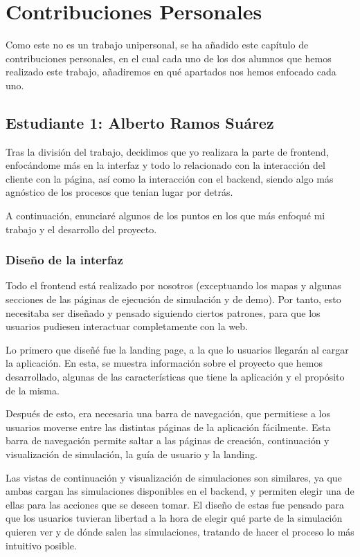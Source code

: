 \chapter*{Contribuciones Personales}
\label{cap:contribucionesPersonales}

Como este no es un trabajo unipersonal, se ha añadido este capítulo de contribuciones personales, en el cual cada uno de los dos alumnos que hemos realizado este trabajo, añadiremos en qué apartados nos hemos enfocado cada uno.

\section*{Estudiante 1: Alberto Ramos Suárez}

Tras la división del trabajo, decidimos que yo realizara la parte de frontend, enfocándome más en la interfaz y todo lo relacionado con la interacción del cliente con la página, así como la interacción con el backend, siendo algo más agnóstico de los procesos que tenían lugar por detrás.

A continuación, enunciaré algunos de los puntos en los que más enfoqué mi trabajo y el desarrollo del proyecto.

\subsection*{Diseño de la interfaz}

Todo el frontend está realizado por nosotros (exceptuando los mapas y algunas secciones de las páginas de ejecución de simulación y de demo). Por tanto, esto necesitaba ser diseñado y pensado siguiendo ciertos patrones, para que los usuarios pudiesen interactuar completamente con la web.

Lo primero que diseñé fue la landing page, a la que lo usuarios llegarán al cargar la aplicación. En esta, se muestra información sobre el proyecto que hemos desarrollado, algunas de las características que tiene la aplicación y el propósito de la misma.

Después de esto, era necesaria una barra de navegación, que permitiese a los usuarios moverse entre las distintas páginas de la aplicación fácilmente. Esta barra de navegación permite saltar a las páginas de creación, continuación y visualización de simulación, la guía de usuario y la landing.

Las vistas de continuación y visualización de simulaciones son similares, ya que ambas cargan las simulaciones disponibles en el backend, y permiten elegir una de ellas para las acciones que se deseen tomar. El diseño de estas fue pensado para que los usuarios tuvieran libertad a la hora de elegir qué parte de la simulación quieren ver y de dónde salen las simulaciones, tratando de hacer el proceso lo más intuitivo posible.

